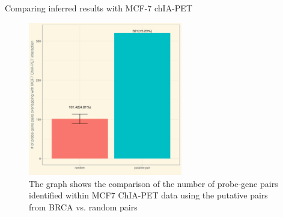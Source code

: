 \documentclass[slidestop,compress,11pt,xcolor=dvipsnames]{beamer}
\begin{document}
\begin{frame}{Comparing inferred results with MCF-7 chIA-PET}

 \begin{figure}[ht!]
  \centering
  \includegraphics[width=0.6\textwidth]{ELMER/validation.png}
  \caption{\label{fig:chiapet} The graph shows the comparison of the number of probe-gene pairs identified within MCF7 ChIA-PET data using the putative pairs from BRCA vs. random pairs}
 \end{figure}
\end{frame}
\end{document}
